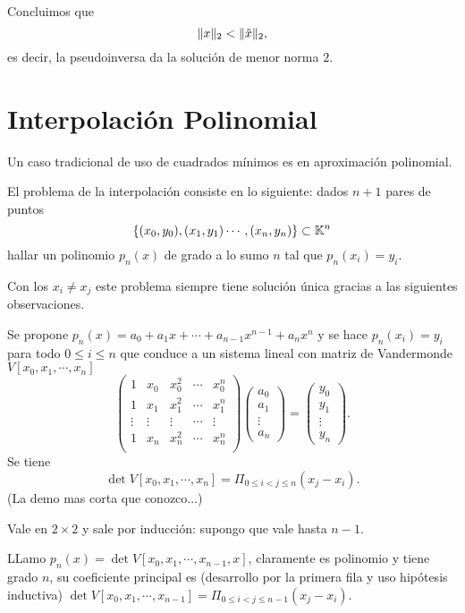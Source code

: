 Concluimos que
$$
\|\xb\|_2<\|\tilde\xb\|_2,
$$
es decir, la pseudoinversa da la solución de menor norma $2$.



\section{Interpolación Polinomial}
Un caso tradicional de uso de cuadrados mínimos es en aproximación polinomial.

El problema de la interpolación consiste en lo siguiente: dados $n+1$ pares de puntos
$$\{(x_{0},y_{0}),(x_{1},y_{1})\cdots ,(x_{n},y_{n})\}\subset \mathbb K^{n}$$
hallar un polinomio $p_{n}(x)$ de grado a lo sumo $n$ tal que $p_{n}(x_{i})=y_{i}$.


Con los $x_{i}\neq x_{j}$ este problema siempre tiene solución única gracias a las siguientes observaciones.



 Se propone $p_{n}(x)=a_{0}+ a_{1}x+\cdots +a_{n-1}x^{n-1} +a_{n}x^{n}$ y se hace $p_{n}(x_{i})=y_{i}$ para todo $0\le i\le n$ que conduce a un sistema lineal con matriz de Vandermonde $V[x_0,x_1,\cdots,x_n]$
 $$
 \begin{pmatrix}
 1&x_{0}&x_{0}^{2}&\cdots &x_{0}^{n}\\
 1&x_{1}&x_{1}^{2}&\cdots &x_{1}^{n}\\
 \vdots&\vdots&\vdots&\cdots&\vdots\\
 1&x_{n}&x_{n}^{2}&\cdots &x_{n}^{n}\\
 \end{pmatrix}
 \begin{pmatrix}
 a_{0}\\
 a_{1}\\
 \vdots\\
 a_{n}
 \end{pmatrix}=
 \begin{pmatrix}
y_{0}\\
 y_{1}\\
 \vdots\\
 y_{n}
 \end{pmatrix}.
 $$
 Se tiene
 $$
 \det V[x_0,x_1,\cdots,x_n]=\Pi_{0\le i<j\le n}(x_j-x_i).
 $$
 (La demo mas corta que conozco...)

 Vale en $2\times 2$ y sale por inducción: supongo que vale hasta $n-1$.

 LLamo
 $p_n(x)=\det V[x_0,x_1,\cdots,x_{n-1},x]$, claramente es polinomio y tiene grado $n$, su coeficiente principal es (desarrollo por la primera fila y uso hipótesis inductiva) $\det V[x_0,x_1,\cdots,x_{n-1}]=\Pi_{0\le i<j\le n-1}(x_j-x_i)$.

